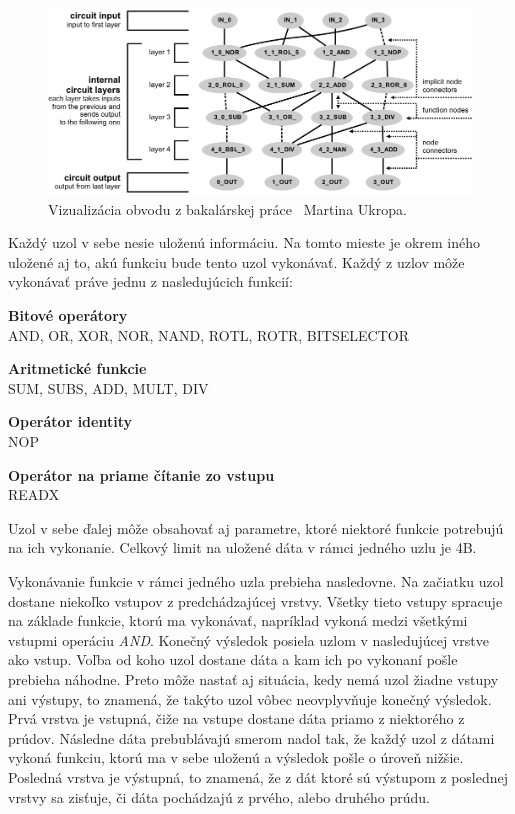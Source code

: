 \begin{figure}[h!]
	\centering
	\includegraphics[scale=0.8]{./img/circuit-final.pdf}
	\caption{Vizualizácia obvodu z {bakalárskej práce}~\parencite{ukrop-bc} Martina Ukropa.}
	\label{obr:circuit-example}
\end{figure} 

Každý uzol v sebe nesie uloženú informáciu. Na tomto mieste je okrem iného uložené aj to, akú funkciu bude tento uzol vykonávať. Každý z uzlov môže vykonávať práve jednu z nasledujúcich funkcií:
\begin{myItemize}
	\item \textbf{Bitové operátory}\\AND, OR, XOR, NOR, NAND, ROTL, ROTR, BITSELECTOR
	\item \textbf{Aritmetické funkcie}\\SUM, SUBS, ADD, MULT, DIV
	\item \textbf{Operátor identity}\\NOP
	\item \textbf{Operátor na priame čítanie zo vstupu}\\READX
\end{myItemize}
Uzol v sebe ďalej môže obsahovať aj parametre, ktoré niektoré funkcie potrebujú na ich vykonanie. Celkový limit na uložené dáta v rámci jedného uzlu je 4B.

Vykonávanie funkcie v rámci jedného uzla prebieha nasledovne. Na začiatku uzol dostane niekoľko vstupov z predchádzajúcej vrstvy. Všetky tieto vstupy spracuje na základe funkcie, ktorú ma vykonávať, napríklad vykoná medzi všetkými vstupmi operáciu \textit{AND}. Konečný výsledok posiela uzlom v nasledujúcej vrstve ako vstup. Voľba od koho uzol dostane dáta a kam ich po vykonaní pošle prebieha náhodne. Preto môže nastať aj situácia, kedy nemá uzol žiadne vstupy ani výstupy, to znamená, že takýto uzol vôbec neovplyvňuje konečný výsledok. Prvá vrstva je vstupná, čiže na vstupe dostane dáta priamo z niektorého z prúdov. Následne dáta prebublávajú smerom nadol tak, že každý uzol z dátami vykoná funkciu, ktorú ma v sebe uloženú a výsledok pošle o úroveň nižšie. Posledná vrstva je výstupná, to znamená, že z dát ktoré sú výstupom z poslednej vrstvy sa zisťuje, či dáta pochádzajú z prvého, alebo druhého prúdu.

